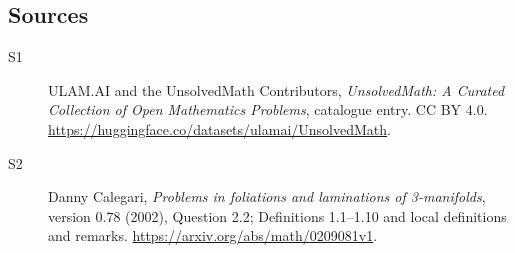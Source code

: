 \documentclass[11pt]{article}
\begin{document}
\subsection{Sources}
\begin{description}
\item[\hypertarget{source:statement:1}{S1}] ULAM.AI and the UnsolvedMath Contributors, \emph{UnsolvedMath: A Curated Collection of Open Mathematics Problems}, catalogue entry. CC BY 4.0. \url{https://huggingface.co/datasets/ulamai/UnsolvedMath}.
\item[\hypertarget{source:statement:2}{S2}] Danny Calegari, \emph{Problems in foliations and laminations of 3-manifolds}, version 0.78 (2002), Question 2.2; Definitions 1.1--1.10 and local definitions and remarks. \url{https://arxiv.org/abs/math/0209081v1}.
\end{description}
\label{end:statement}
\end{document}
